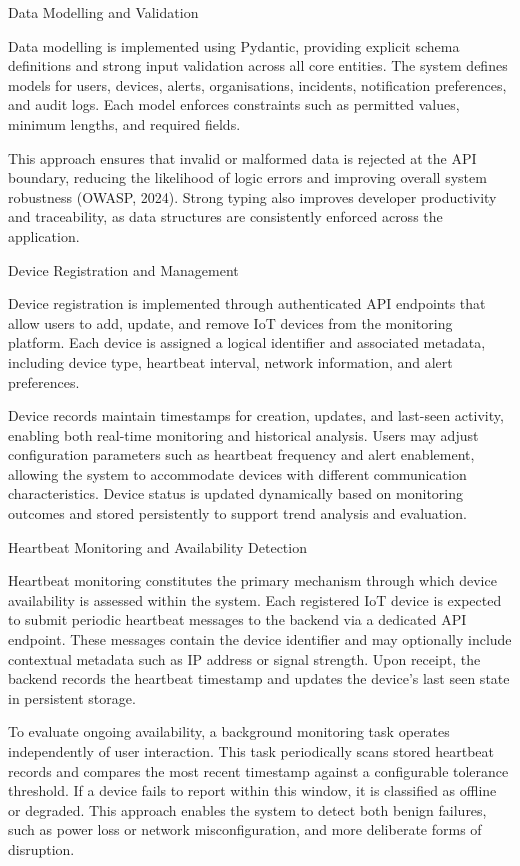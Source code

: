 Data Modelling and Validation

Data modelling is implemented using Pydantic, providing explicit schema definitions and strong input validation across all core entities. The system defines models for users, devices, alerts, organisations, incidents, notification preferences, and audit logs. Each model enforces constraints such as permitted values, minimum lengths, and required fields.

This approach ensures that invalid or malformed data is rejected at the API boundary, reducing the likelihood of logic errors and improving overall system robustness (OWASP, 2024). Strong typing also improves developer productivity and traceability, as data structures are consistently enforced across the application.

Device Registration and Management

Device registration is implemented through authenticated API endpoints that allow users to add, update, and remove IoT devices from the monitoring platform. Each device is assigned a logical identifier and associated metadata, including device type, heartbeat interval, network information, and alert preferences.

Device records maintain timestamps for creation, updates, and last-seen activity, enabling both real-time monitoring and historical analysis. Users may adjust configuration parameters such as heartbeat frequency and alert enablement, allowing the system to accommodate devices with different communication characteristics. Device status is updated dynamically based on monitoring outcomes and stored persistently to support trend analysis and evaluation.

Heartbeat Monitoring and Availability Detection

Heartbeat monitoring constitutes the primary mechanism through which device availability is assessed within the system. Each registered IoT device is expected to submit periodic heartbeat messages to the backend via a dedicated API endpoint. These messages contain the device identifier and may optionally include contextual metadata such as IP address or signal strength. Upon receipt, the backend records the heartbeat timestamp and updates the device's last seen state in persistent storage.

To evaluate ongoing availability, a background monitoring task operates independently of user interaction. This task periodically scans stored heartbeat records and compares the most recent timestamp against a configurable tolerance threshold. If a device fails to report within this window, it is classified as offline or degraded. This approach enables the system to detect both benign failures, such as power loss or network misconfiguration, and more deliberate forms of disruption.

